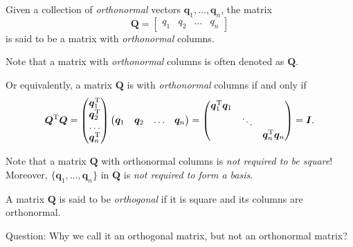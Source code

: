 \begin{definition}
Given a collection of \emph{orthonormal} vectors $\bm q_1,\dots,\bm q_n$, the matrix 
\[
\bm Q=\begin{bmatrix}
q_1&q_2&\dots&q_n
\end{bmatrix}
\]
is said to be a matrix with \emph{orthonormal} columns.

Note that a matrix with \emph{orthonormal} columns is often denoted as $\bm Q$.
\end{definition}
Or equivalently, a matrix $\bm Q$ is with \emph{orthonormal} columns if and only if
\begin{equation}\label{eq:easy_to_work}
\bm Q\trans\bm Q=\begin{pmatrix}
\bm q_1\trans\\\bm q_2\trans\\\dots\\\bm q_n\trans
\end{pmatrix}\begin{pmatrix}
\bm q_1&\bm q_2&\dots&\bm q_n
\end{pmatrix}=\begin{pmatrix}
\bm q_1\trans\bm q_1&&\\
&\ddots&\\
&&\bm q_n\trans\bm q_n
\end{pmatrix}=\bm I.
\end{equation}
\begin{remark}
Note that a matrix $\bm Q$ with orthonormal columns  is \textit{not required to be square}! Moreover, $\{\bm q_1,\dots,\bm q_n\}$ in $\bm Q$ is \textit{not required to form a basis}.
\end{remark}
\begin{definition}
A matrix $\bm Q$ is said to be \emph{orthogonal} if it is square and its columns are orthonormal.
\end{definition}

Question: Why we call it an
orthogonal matrix, but not an orthonormal matrix?


